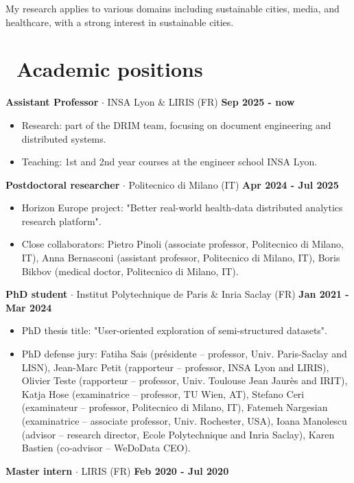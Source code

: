 \documentclass{article}
\begin{document}
	My research applies to various domains including sustainable cities, media, and healthcare, with a strong interest in sustainable cities.\section*{\faBriefcase\ Academic positions}
\noindent\textbf{Assistant Professor} $\cdot$ INSA Lyon \& LIRIS (FR) \hfill \textbf{Sep 2025 - now}
\begin{itemize}
\item Research: part of the DRIM team, focusing on document engineering and distributed systems.
\item Teaching: 1st and 2nd year courses at the engineer school INSA Lyon.
\end{itemize}
\vspace{1em}\noindent\textbf{Postdoctoral researcher} $\cdot$ Politecnico di Milano (IT) \hfill \textbf{Apr 2024 - Jul 2025}
\begin{itemize}
\item Horizon Europe project: "Better real-world health-data distributed analytics research platform".
\item Close collaborators: Pietro Pinoli (associate professor, Politecnico di Milano, IT), Anna Bernasconi (assistant professor, Politecnico di Milano, IT), Boris Bikbov (medical doctor, Politecnico di Milano, IT).
\end{itemize}
\vspace{1em}\noindent\textbf{PhD student} $\cdot$ Institut Polytechnique de Paris \& Inria Saclay (FR) \hfill \textbf{Jan 2021 - Mar 2024}
\begin{itemize}
\item PhD thesis title: "User-oriented exploration of semi-structured datasets".
\item PhD defense jury: Fatiha Sais (présidente – professor, Univ. Paris-Saclay and LISN), Jean-Marc Petit (rapporteur – professor, INSA Lyon and LIRIS), Olivier Teste (rapporteur – professor, Univ. Toulouse Jean Jaurès and IRIT), Katja Hose (examinatrice – professor, TU Wien, AT), Stefano Ceri (examinateur – professor, Politecnico di Milano, IT), Fatemeh Nargesian (examinatrice – associate professor, Univ. Rochester, USA), Ioana Manolescu (advisor – research director, Ecole Polytechnique and Inria Saclay), Karen Bastien (co-advisor – WeDoData CEO).
\end{itemize}
\vspace{1em}\noindent\textbf{Master intern} $\cdot$ LIRIS (FR) \hfill \textbf{Feb 2020 - Jul 2020}
\end{document}
